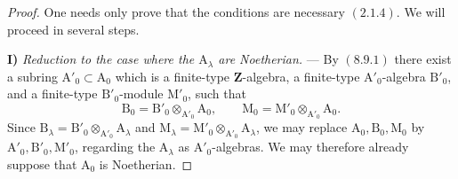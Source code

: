 \begin{proof}
One needs only prove that the conditions are necessary $(2.1.4)$. We will proceed in several steps.

\medskip
\noindent\textbf{I)} \emph{Reduction to the case where the
$\mathrm{A}_\lambda$ are Noetherian.} --- By $(8.9.1)$ there exist a
subring $\mathrm{A}'_0\subset\mathrm{A}_0$ which is a finite-type
$\mathbf{Z}$-algebra, a finite-type $\mathrm{A}'_0$-algebra
$\mathrm{B}'_0$, and a finite-type $\mathrm{B}'_0$-module
$\mathrm{M}'_0$, such that
\[
  \mathrm{B}_0=\mathrm{B}'_0\otimes_{\mathrm{A}'_0}\mathrm{A}_0,
  \qquad
  \mathrm{M}_0=\mathrm{M}'_0\otimes_{\mathrm{A}'_0}\mathrm{A}_0.
\]
Since
$\mathrm{B}_\lambda=\mathrm{B}'_0\otimes_{\mathrm{A}'_0}
\mathrm{A}_\lambda$ and
$\mathrm{M}_\lambda=\mathrm{M}'_0\otimes_{\mathrm{A}'_0}
\mathrm{A}_\lambda$, we may replace
$\mathrm{A}_0,\mathrm{B}_0,\mathrm{M}_0$ by
$\mathrm{A}'_0,\mathrm{B}'_0,\mathrm{M}'_0$, regarding the
$\mathrm{A}_\lambda$ as $\mathrm{A}'_0$-algebras. We may therefore
already suppose that $\mathrm{A}_0$ is Noetherian.


\end{proof}
